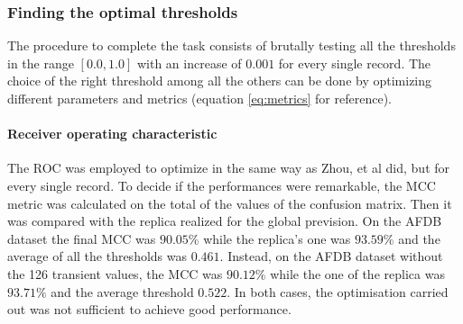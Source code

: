 \subsubsection{Finding the optimal thresholds}
The procedure to complete the task consists of brutally testing all the thresholds in the range $[0.0,1.0]$ with an increase of $0.001$ for every single record. The choice of the right threshold among all the others can be done by optimizing different parameters and metrics (equation \ref{eq:metrics} for reference).

\paragraph{Receiver operating characteristic}
The ROC was employed to optimize in the same way as Zhou, et al\cite{zhou2015} did, but for every single record. To decide if the performances were remarkable, the MCC metric was calculated on the total of the values of the confusion matrix. Then it was compared with the replica realized for the global prevision. On the AFDB dataset the final MCC was $90.05\%$ while the replica's one was $93.59\%$ and the average of all the thresholds was $0.461$. Instead, on the AFDB dataset without the 126 transient values, the MCC was $90.12\%$ while the one of the replica was $93.71\%$ and the average threshold $0.522$. In both cases, the optimisation carried out was not sufficient to achieve good performance.

